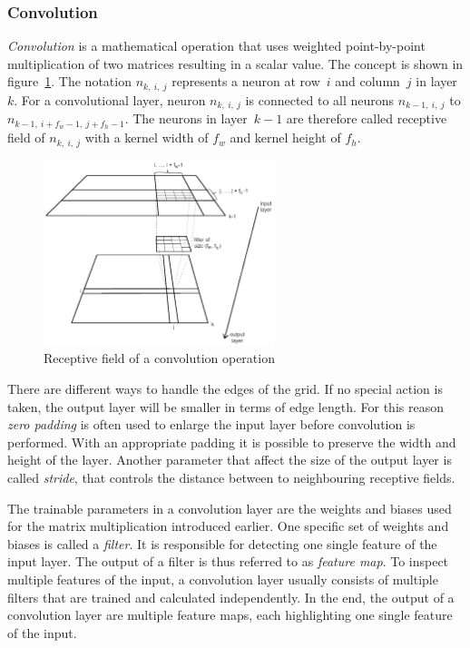 \subsubsection{Convolution}
\label{sec:convolution}
\emph{Convolution} is a mathematical operation that uses weighted point-by-point multiplication of two matrices resulting in a scalar value. The concept is shown in figure~\ref{fig:convolution}. The notation $n_{k,~i,~j}$ represents a neuron at row~$i$ and column~$j$ in layer~$k$. For a convolutional layer, neuron $n_{k,~i,~j}$ is connected to all neurons $n_{k-1,~i,~j}$ to $n_{k-1,~i + f_w -1,~j + f_h -1}$. The neurons in layer~$k-1$ are therefore called receptive field of $n_{k,~i,~j}$ with a kernel width of $f_w$ and kernel height of $f_h$.~\cite[p.~361 f]{praxiseinstieg_ml17}

\begin{figure}[h]
    \centering
    \includegraphics[width=0.6\textwidth]{images/convolution_template}
    \caption{Receptive field of a convolution operation}
    \label{fig:convolution}
\end{figure}

There are different ways to handle the edges of the grid. If no special action is taken, the output layer will be smaller in terms of edge length. For this reason \emph{zero padding} is often used to enlarge the input layer before convolution is performed. With an appropriate padding it is possible to preserve the width and height of the layer. Another parameter that affect the size of the output layer is called \emph{stride}, that controls the distance between to neighbouring receptive fields.~\cite[p.~361]{praxiseinstieg_ml17}

The trainable parameters in a convolution layer are the weights and biases used for the matrix multiplication introduced earlier. One specific set of weights and biases is called a \emph{filter}. It is responsible for detecting one single feature of the input layer. The output of a filter is thus referred to as \emph{feature map}. To inspect multiple features of the input, a convolution layer usually consists of multiple filters that are trained and calculated independently. In the end, the output of a convolution layer are multiple feature maps, each highlighting one single feature of the input.~\cite[p.~363 f]{praxiseinstieg_ml17}

